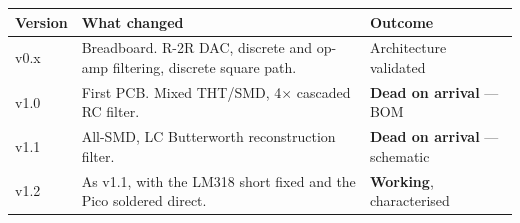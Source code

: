 \documentclass[11pt,a4paper]{article}
\begin{document}
\begin{table}[H]
    \centering
    \small
    \begin{tabularx}{\linewidth}{@{}l X l@{}}
        \toprule
        \rowcolor{accentpale}
        \textbf{\color{accent}Version} & \textbf{\color{accent}What changed}                                  & \textbf{\color{accent}Outcome}                     \\
        \midrule
        v0.x                           & Breadboard. R-2R DAC, discrete and op-amp filtering, discrete square
        path.                          & Architecture validated                                                                                                    \\
        v1.0                           & First PCB. Mixed THT/SMD, 4$\times$ cascaded RC filter.              & \textcolor{fail}{\textbf{Dead on arrival}} --- BOM \\
        v1.1                           & All-SMD, LC Butterworth reconstruction filter.                       & \textcolor{fail}{\textbf{Dead on arrival}} ---
        schematic                                                                                                                                                  \\
        v1.2                           & As v1.1, with the LM318 short fixed and the Pico soldered direct.    & \textcolor{accent}{\textbf{Working}},
        characterised                                                                                                                                              \\
        \bottomrule
    \end{tabularx}
\end{table}
\end{document}
